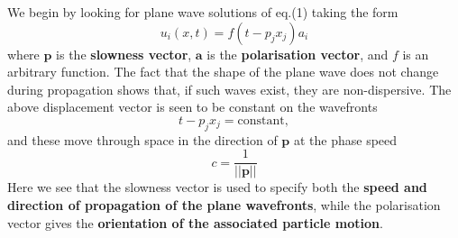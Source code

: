 \documentclass [a4paper,12pt]{paper}
\begin{document}
We begin by looking for plane wave solutions of eq.(1) taking the form
\begin{equation}
u_{i}(x,t)=f(t-p_{j}x_{j})a_{i}
\end{equation}
where $\mathbf{p}$ is the  \textbf{slowness vector}, $\mathbf{a}$ is the \textbf{polarisation vector}, and $f$ is an arbitrary function. 
The fact that the shape of the plane wave does 
not change during propagation shows that, if such waves exist, they are non-dispersive. The above displacement vector is seen to be 
constant on the wavefronts
\begin{equation}
t-p_{j}x_{j}=\text{constant},
\end{equation}
and these move through space in the direction of $\mathbf{p}$ at the phase speed
\begin{equation}
c=\frac{1}{||\mathbf{p}||}
\end{equation}
Here we see that the slowness vector is used to specify both the \textbf{speed and direction of propagation of the plane wavefronts}, 
while the polarisation vector gives the \textbf{orientation of the associated particle motion}.
 
\end{document}

